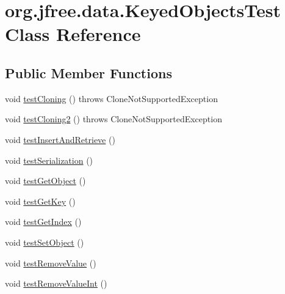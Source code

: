 \hypertarget{classorg_1_1jfree_1_1data_1_1_keyed_objects_test}{}\section{org.\+jfree.\+data.\+Keyed\+Objects\+Test Class Reference}
\label{classorg_1_1jfree_1_1data_1_1_keyed_objects_test}
\subsection*{Public Member Functions}
\begin{DoxyCompactItemize}
\item 
void \mbox{\hyperlink{classorg_1_1jfree_1_1data_1_1_keyed_objects_test_a438d09783ced6c13b252e303c6b6f160}{test\+Cloning}} ()  throws Clone\+Not\+Supported\+Exception 
\item 
void \mbox{\hyperlink{classorg_1_1jfree_1_1data_1_1_keyed_objects_test_aa2ab741a149402a848de79ae4ac6daaf}{test\+Cloning2}} ()  throws Clone\+Not\+Supported\+Exception 
\item 
void \mbox{\hyperlink{classorg_1_1jfree_1_1data_1_1_keyed_objects_test_a05d043102b01ca1c6a53b4bdb97fc425}{test\+Insert\+And\+Retrieve}} ()
\item 
void \mbox{\hyperlink{classorg_1_1jfree_1_1data_1_1_keyed_objects_test_ad3e916d4fb1973539cfd7c7465f9a4ce}{test\+Serialization}} ()
\item 
void \mbox{\hyperlink{classorg_1_1jfree_1_1data_1_1_keyed_objects_test_abd818b1d3b0e965cce646ff37bed57de}{test\+Get\+Object}} ()
\item 
void \mbox{\hyperlink{classorg_1_1jfree_1_1data_1_1_keyed_objects_test_adcc42c3510ac1171562b70e583980b93}{test\+Get\+Key}} ()
\item 
void \mbox{\hyperlink{classorg_1_1jfree_1_1data_1_1_keyed_objects_test_a5496d6d4f37d7ddf2b41faff2afbd15a}{test\+Get\+Index}} ()
\item 
void \mbox{\hyperlink{classorg_1_1jfree_1_1data_1_1_keyed_objects_test_a68c06178d00ed17cc2365af796bea490}{test\+Set\+Object}} ()
\item 
void \mbox{\hyperlink{classorg_1_1jfree_1_1data_1_1_keyed_objects_test_ad77e76675863b447ace2d771b8168b2b}{test\+Remove\+Value}} ()
\item 
void \mbox{\hyperlink{classorg_1_1jfree_1_1data_1_1_keyed_objects_test_aa393cb07b91e80845192a0164494a475}{test\+Remove\+Value\+Int}} ()
\end{DoxyCompactItemize}



